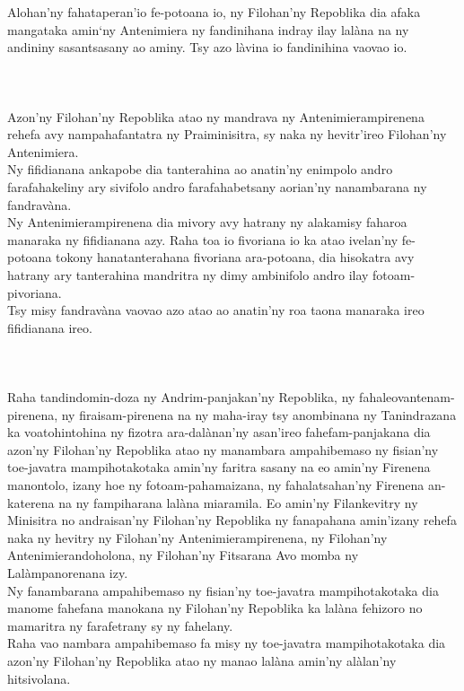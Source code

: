 \documentclass[12pt]{article}
\newcounter{laharana}
\newcommand{\andininy}[0]{
  \paragraph{%
    \NoCaseChange{%
      Andininy~\addtocounter{laharana}{1}\thelaharana.}\label{and:\thelaharana}~%
  }%
}
\begin{document}
\noindent
Alohan'ny fahataperan'io fe-potoana io, ny Filohan'ny Repoblika dia afaka
mangataka amin‘ny Antenimiera ny fandinihana indray ilay lalàna na ny andininy
sasantsasany ao aminy. Tsy azo làvina io fandinihina vaovao io.

\andininy{}Azon'ny Filohan'ny Repoblika atao ny mandrava ny
Antenimierampirenena rehefa avy nampahafantatra ny Praiminisitra, sy naka ny
hevitr'ireo Filohan'ny Antenimiera.\\

\noindent
Ny fifidianana ankapobe dia tanterahina ao anatin'ny enimpolo andro
farafahakeliny ary sivifolo andro farafahabetsany aorian'ny nanambarana ny
fandravàna.\\

\noindent
Ny Antenimierampirenena dia mivory avy hatrany ny alakamisy faharoa manaraka ny
fifidianana azy. Raha toa io fivoriana io ka atao ivelan'ny fe-potoana tokony
hanatanterahana fivoriana ara-potoana, dia hisokatra avy hatrany ary tanterahina
mandritra ny dimy ambinifolo andro ilay fotoam-pivoriana.\\

\noindent
Tsy misy fandravàna vaovao azo atao ao anatin'ny roa taona manaraka ireo
fifidianana ireo.

\andininy{}Raha tandindomin-doza ny Andrim-panjakan'ny Repoblika, ny
fahaleovantenam-pirenena, ny firaisam-pirenena na ny maha-iray tsy anombinana ny
Tanindrazana ka voatohintohina ny fizotra ara-dalànan'ny asan'ireo
fahefam-panjakana dia azon'ny Filohan'ny Repoblika atao ny manambara
ampahibemaso ny fisian'ny toe-javatra mampihotakotaka amin'ny faritra sasany na
eo amin'ny Firenena manontolo, izany hoe ny fotoam-pahamaizana, ny
fahalatsahan'ny Firenena an-katerena na ny fampiharana lalàna miaramila. Eo
amin'ny Filankevitry ny Minisitra no andraisan'ny Filohan'ny Repoblika ny
fanapahana amin'izany rehefa naka ny hevitry ny Filohan'ny Antenimierampirenena,
ny Filohan'ny Antenimierandoholona, ny Filohan'ny Fitsarana Avo momba ny
Lalàmpanorenana izy.\\

\noindent
Ny fanambarana ampahibemaso ny fisian'ny toe-javatra mampihotakotaka dia manome
fahefana manokana ny Filohan'ny Repoblika ka lalàna fehizoro no mamaritra ny
farafetrany sy ny fahelany.\\

\noindent
Raha vao nambara ampahibemaso fa misy ny toe-javatra mampihotakotaka dia azon'ny
Filohan'ny Repoblika atao ny manao lalàna amin'ny alàlan'ny hitsivolana.
\end{document}
